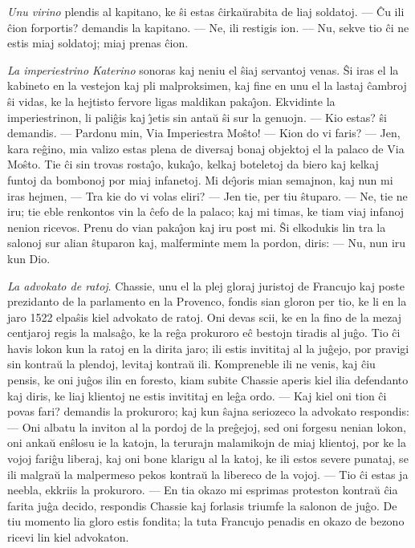 \emph{Unu virino} plendis al kapitano, ke \^si estas \^cirka\u
urabita de liaj soldatoj. --- \^Cu ili \^cion forportis? demandis la
kapitano. --- Ne, ili restigis ion. --- Nu, sekve tio \^ci ne estis
miaj soldatoj; miaj prenas \^cion.

\emph{La imperiestrino Katerino} sonoras kaj neniu el \^siaj
servantoj venas. \^Si iras el la kabineto en la vestejon kaj pli
malproksimen, kaj fine en unu el la lastaj \^cambroj \^si vidas, ke
la hejtisto fervore ligas maldikan paka\^{\j}on. Ekvidinte la
imperiestrinon, li pali\^gis kaj \^{\j}etis sin anta\u u \^si sur la
genuojn. --- Kio estas? \^si demandis. --- Pardonu min, Via
Imperiestra Mo\^sto! --- Kion do vi faris? --- Jen, kara re\^gino,
mia valizo estas plena de diversaj bonaj objektoj el la palaco de
Via Mo\^sto. Tie \^ci sin trovas rosta\^{\j}o, kuka\^{\j}o, kelkaj
boteletoj da biero kaj kelkaj funtoj da bombonoj por miaj infanetoj.
Mi de\^{\j}oris mian semajnon, kaj nun mi iras hejmen, --- Tra kie
do vi volas eliri? --- Jen tie, per tiu \^stuparo. --- Ne, tie ne
iru; tie eble renkontos vin la \^cefo de la palaco; kaj mi timas, ke
tiam viaj infanoj nenion ricevos. Prenu do vian paka\^{\j}on kaj iru
post mi. \^Si elkodukis lin tra la salonoj sur alian \^stuparon kaj,
malferminte mem la pordon, diris: --- Nu, nun iru kun Dio.

\emph{La advokato de ratoj}. Chassie, unu el la plej gloraj juristoj
de Francujo kaj poste prezidanto de la parlamento en la Provenco,
fondis sian gloron per tio, ke li en la jaro 1522 elpa\^sis kiel
advokato de ratoj. Oni devas scii, ke en la fino de la mezaj
centjaroj regis la malsa\^go, ke la re\^ga prokuroro e\^c bestojn
tiradis al ju\^go. Tio \^ci havis lokon kun la ratoj en la dirita
jaro; ili estis invititaj al la ju\^gejo, por pravigi sin kontra\u u
la plendoj, levitaj kontra\u u ili. Kompreneble ili ne venis, kaj
\^ciu pensis, ke oni ju\^gos ilin en foresto, kiam subite Chassie
aperis kiel ilia defendanto kaj diris, ke liaj klientoj ne estis
invititaj en le\^ga ordo. --- Kaj kiel oni tion \^ci povas fari?
demandis la prokuroro; kaj kun \^sajna seriozeco la advokato
respondis: --- Oni albatu la inviton al la pordoj de la pre\^gejoj,
sed oni forgesu nenian lokon, oni anka\u u en\^slosu ie la katojn,
la terurajn malamikojn de miaj klientoj, por ke la vojoj fari\^gu
liberaj, kaj oni bone klarigu al la katoj, ke ili estos severe
punataj, se ili malgra\u u la malpermeso pekos kontra\u u la
libereco de la vojoj. --- Tio \^ci estas ja neebla, ekkriis la
prokuroro. --- En tia okazo mi esprimas proteston kontra\u u \^cia
farita ju\^ga decido, respondis Chassie kaj forlasis triumfe la
salonon de ju\^go. De tiu momento lia gloro estis fondita; la tuta
Francujo penadis en okazo de bezono ricevi lin kiel advokaton.

